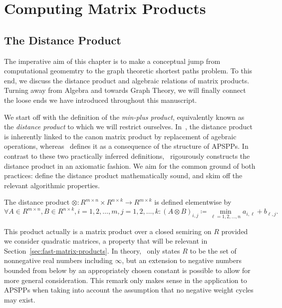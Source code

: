\chapter{Computing Matrix Products}\label{chap:matrix-products}

\section{The Distance Product}\label{sec:dist-prod}

The imperative aim of this chapter is to make a conceptual jump from computational geomemtry to the graph theoretic shortest paths problem.
To this end, we discuss the distance product and algebraic relations of matrix products.
Turning away from Algebra and towards Graph Theory, we will finally connect the loose ends we have introduced throughout this manuscript.

We start off with the definition of the \emph{min-plus product}, equivalently known as the \emph{distance product} to which we will restrict ourselves.
In~\cite[Chapter~25]{Cormen2001}, the distance product is inherently linked to the canon matrix product by replacement of agebraic operations, whereas~\cite{Chan2007} defines it as a consequence of the structure of APSPPs.
In contrast to these two practically inferred definitions,\ \cite[Section~5.6]{Aho1974} rigourously constructs the distance product in an axiomatic fashion.
We aim for the common ground of both practices: define the distance product mathematically sound, and skim off the relevant algorithmic properties.

\begin{definition}\label{def:distance-product}
    The distance product $\otimes: R^{m \times n} \times R^{n \times k} \rightarrow R^{m \times k}$ is defined elementwise by
    \[
        \forall A \in R^{m \times n}, B \in R^{n \times k}, i = 1, 2, \dots, m, j = 1, 2, \dots, k: {\left( A \otimes B \right)}_{i, j} \coloneqq \min\limits_{\ell = 1, 2, \dots, n} a_{i, \ell} + b_{\ell, j}.
    \]
\end{definition}

This product actually is a matrix product over a closed semiring on $R$ provided we consider quadratic matrices, a property that will be relevant in Section~\ref{sec:fast-matrix-products}.
In theory,\ \cite[Example~5.9]{Aho1974} only states $R$ to be the set of nonnegative real numbers including $\infty$, but an extension to negative numbers bounded from below by an appropriately chosen constant is possible to allow for more general consideration.
This remark only makes sense in the application to APSPPs when taking into account the assumption that no negative weight cycles may exist.

